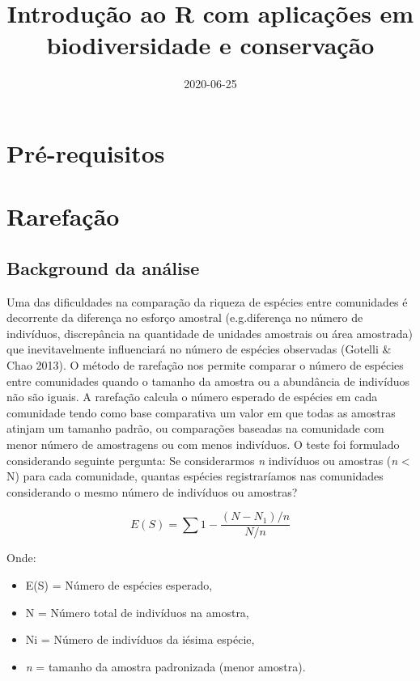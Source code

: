 \documentclass[
]{book}
\title{Introdução ao R com aplicações em biodiversidade e conservação}
\author{}
\date{\vspace{-2.5em}2020-06-25}
\begin{document}
\maketitle

{
\setcounter{tocdepth}{1}
\tableofcontents
}
\hypertarget{pruxe9-requisitos}{%
\chapter{Pré-requisitos}\label{pruxe9-requisitos}}

\hypertarget{rarefauxe7uxe3o}{%
\chapter{Rarefação}\label{rarefauxe7uxe3o}}

\hypertarget{background-da-anuxe1lise}{%
\section{Background da análise}\label{background-da-anuxe1lise}}

Uma das dificuldades na comparação da riqueza de espécies entre comunidades é decorrente da diferença no esforço amostral (e.g.diferença no número de indivíduos, discrepância na quantidade de unidades amostrais ou área amostrada) que inevitavelmente influenciará no número de espécies observadas (Gotelli \& Chao 2013). O método de rarefação nos permite comparar o número de espécies entre comunidades quando o tamanho da amostra ou a abundância de indivíduos não são iguais. A rarefação calcula o número esperado de espécies em cada comunidade tendo como base comparativa um valor em que todas as amostras atinjam um tamanho padrão, ou comparações baseadas na comunidade com menor número de amostragens ou com menos indivíduos. O teste foi formulado considerando seguinte pergunta: Se considerarmos \emph{n} indivíduos ou amostras (\emph{n} \textless{} N) para cada comunidade, quantas espécies registraríamos nas comunidades considerando o mesmo número de indivíduos ou amostras?

\[E(S) = \sum 1 - \frac{{(N - N_1)}/{n}}{{N}/{n}}\]

Onde:

\begin{itemize}
\item
  E(S) = Número de espécies esperado,
\item
  N = Número total de indivíduos na amostra,
\item
  Ni = Número de indivíduos da iésima espécie,
\item
  \emph{n} = tamanho da amostra padronizada (menor amostra).
\end{itemize}
\end{document}
